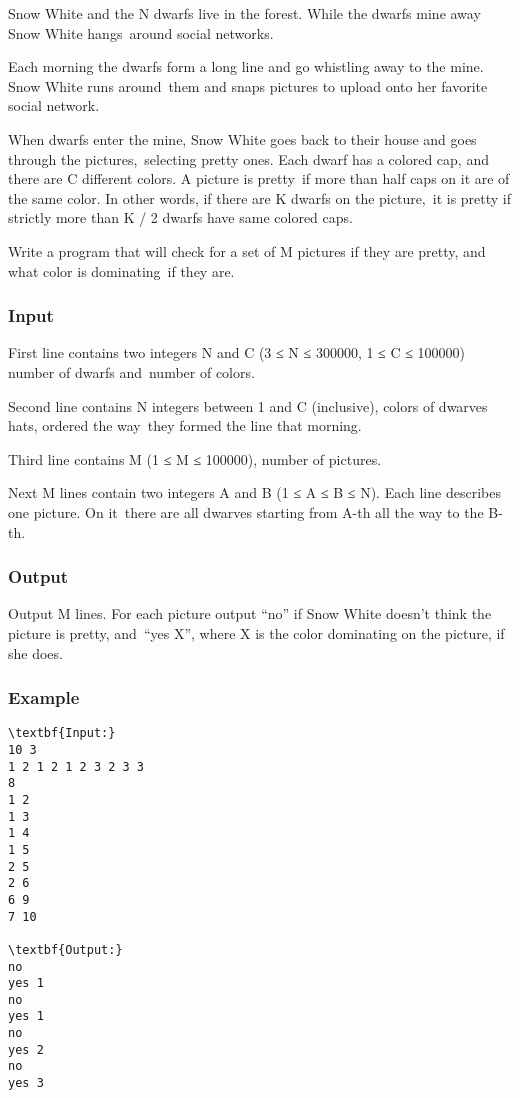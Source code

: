 



   Snow White and the N dwarfs live in the forest. While the dwarfs mine away Snow White hangs around social networks.  

   Each morning the dwarfs form a long line and go whistling away to the mine. Snow White runs around them and snaps pictures to upload onto her favorite social network.  

   When dwarfs enter the mine, Snow White goes back to their house and goes through the pictures, selecting pretty ones. Each dwarf has a colored cap, and there are C different colors. A picture is pretty if more than half caps on it are of the same color. In other words, if there are K dwarfs on the picture, it is pretty if strictly more than K / 2 dwarfs have same colored caps.  

   Write a program that will check for a set of M pictures if they are pretty, and what color is dominating if they are.  

\subsubsection{\textbf{    Input   }}

   First line contains two integers N and C (3 ≤ N ≤ 300000, 1 ≤ C ≤ 100000) number of dwarfs and number of colors.  

   Second line contains N integers between 1 and C (inclusive), colors of dwarves hats, ordered the way they formed the line that morning.  

   Third line contains M (1 ≤ M ≤ 100000), number of pictures.  

   Next M lines contain two integers A and B (1 ≤ A ≤ B ≤ N). Each line describes one picture. On it there are all dwarves starting from A-th all the way to the B-th.  

\subsubsection{   Output  }

   Output M lines. For each picture output “no” if Snow White doesn't think the picture is pretty, and “yes X”, where X is the color dominating on the picture, if she does.  

\subsubsection{   Example  }
\begin{verbatim}
\textbf{Input:}
10 3
1 2 1 2 1 2 3 2 3 3
8
1 2
1 3
1 4
1 5
2 5
2 6
6 9
7 10

\textbf{Output:}
no
yes 1
no
yes 1
no
yes 2
no
yes 3\end{verbatim}